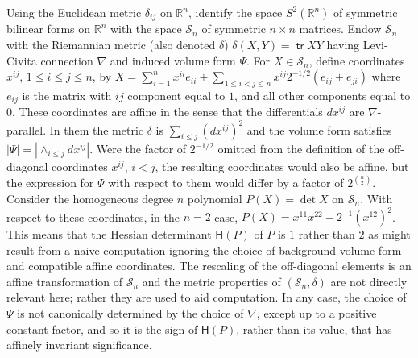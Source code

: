 \documentclass [leqno, 10pt]{amsart}
\theoremstyle{definition}
\numberwithin{equation}{section}
\newcommand{\sm}{\mathscr{S}}
\renewcommand{\H}{\mathsf{H}}
\newcommand{\rea}{\mathbb R}
\newcommand{\tr}{\operatorname{\mathsf{tr}}}
\begin{document}
\begin{example}\label{detexample}
Using the Euclidean metric $\delta_{ij}$ on $\rea^{n}$, identify the space $S^{2}(\rea^{n})$ of symmetric bilinear forms on $\rea^{n}$ with the space $\sm_{n}$ of symmetric $n \times n$ matrices. Endow $\sm_{n}$ with the Riemannian metric (also denoted $\delta$) $\delta(X, Y) = \tr XY$ having Levi-Civita connection $\nabla$ and induced volume form $\Psi$. For $X \in \sm_{n}$, define coordinates $x^{ij}$, $1 \leq i \leq j \leq n$, by $X = \sum_{i = 1}^{n}x^{ii}e_{ii} + \sum_{1 \leq i  < j \leq n}x^{ij}2^{-1/2}(e_{ij} + e_{ji})$ where $e_{ij}$ is the matrix with $ij$ component equal to $1$, and all other components equal to $0$. These coordinates are affine in the sense that the differentials $dx^{ij}$ are $\nabla$-parallel. In them the metric $\delta$ is $\sum_{i \leq j}(dx^{ij})^{2}$ and the volume form satisfies $|\Psi| = |\wedge_{i \leq j}dx^{ij}|$. Were the factor of $2^{-1/2}$ omitted from the definition of the off-diagonal coordinates $x^{ij}$, $i < j$, the resulting coordinates would also be affine, but the expression for $\Psi$ with respect to them would differ by a factor of $2^{\binom{n}{2}}$.
Consider the homogeneous degree $n$ polynomial $P(X) = \det X$ on $\sm_{n}$. With respect to these coordinates, in the $n = 2$ case, $P(X) = x^{11}x^{22} - 2^{-1}(x^{12})^{2}$. This means that the Hessian determinant $\H(P)$ of $P$ is $1$ rather than $2$ as might result from a naive computation ignoring the choice of background volume form and compatible affine coordinates. The rescaling of the off-diagonal elements is an affine transformation of $\sm_{n}$ and the metric properties of $(\sm_{n}, \delta)$ are not directly relevant here; rather they are used to aid computation. In any case, the choice of $\Psi$ is not canonically determined by the choice of $\nabla$, except up to a positive constant factor, and so it is the sign of $\H(P)$, rather than its value, that has affinely invariant significance. 


\end{example}
\end{document}
